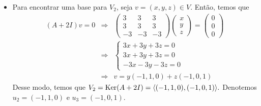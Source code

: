 \documentclass[11pt,a4paper]{article}
\begin{document}
{\begin{itemize}
\item Para encontrar uma base para $V_2$, seja $v = (x, y, z) \in V.$ Então, temos que
\[
\begin{array}{rcl}
(A + 2I)v = 0 &\Rightarrow& \begin{pmatrix}
3 & 3 & 3 \\
3 & 3 & 3 \\
-3 & -3 & -3
\end{pmatrix} \begin{pmatrix}
x \\ y \\ z
\end{pmatrix} = \begin{pmatrix}
0 \\ 0 \\ 0
\end{pmatrix} \\&\Rightarrow& \begin{cases}
3x + 3y + 3z = 0 \\
3x+3y+3z = 0 \\
-3x-3y-3z = 0
\end{cases} \\&\Rightarrow& v = y (-1,1,0) + z (-1,0,1)
\end{array}
\]
Desse modo, temos que $V_2 = \operatorname{Ker}(A + 2I) = \langle (-1,1,0), (-1,0,1) \rangle.$ Denotemos $u_2 = (-1,1,0)$ e $u_3 =  (-1,0,1).$ 
\end{itemize}

}
\end{document}
